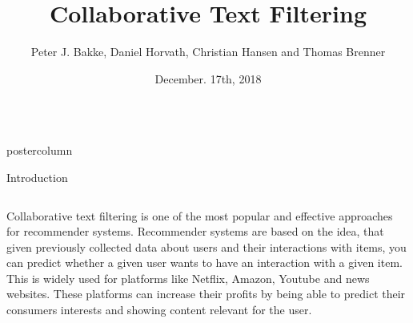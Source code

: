 \documentclass[final,hyperref={pdfpagelabels=false}]{beamer}
\title{
\huge Collaborative Text Filtering}
\author{Peter J. Bakke, Daniel Horvath, Christian Hansen and Thomas Brenner}
\institute[Department]{\small DTU Compute, Technical University of Denmark}
\date[December. 17th, 2018]{December. 17th, 2018}
\newlength{\columnheight}
\begin{document}
\begin{frame}
 \begin{columns}
 \begin{column}{.49\paperwidth}
 \begin{beamercolorbox}[center,wd=\textwidth]{postercolumn}
 \begin{minipage}[T]{.99\textwidth}  %
 \parbox[t][\columnheight]{\textwidth}{ %

\begin{block}{Introduction}
 \begin{columns}
 \begin{column}{1\textwidth}


%
%
\centering
\begin{minipage}[t]{0.98\textwidth}

\small{Collaborative text filtering is one of the most popular and effective approaches for recommender systems. Recommender systems are based on the idea, that given previously collected data about users and their interactions with items, you can predict whether a given user wants to have an interaction with a given item. This is widely used for platforms like Netflix, Amazon, Youtube and news websites. These platforms can increase their profits by being able to predict their consumers interests and showing content relevant for the user. 

}
\end{minipage}
\end{column}
\end{columns}
\end{block}}
\end{minipage}
\end{beamercolorbox}
\end{column}
\end{columns}
\end{frame}
\end{document}

